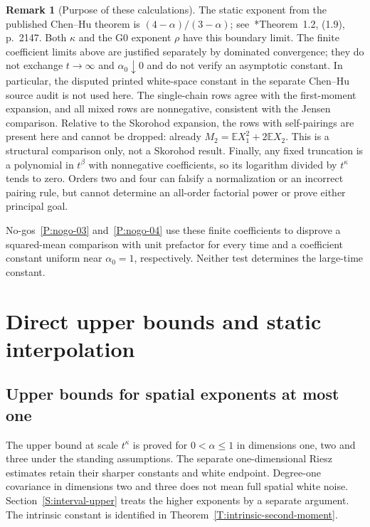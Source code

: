 \documentclass[12pt,oneside,openany]{book}
\numberwithin{equation}{section}
\theoremstyle{nogostyle}
\theoremstyle{definition}
\newtheorem{remark}[theorem]{Remark}
\newcommand{\E}{\mathbb{E}}
\begin{document}
\begin{remark}[Purpose of these calculations]\label{R:G1-scope}
  The static exponent from the published Chen--Hu theorem is
  $(4-\alpha)/(3-\alpha)$; see~\cite{chen.hu:25:hyperbolic}*{Theorem~1.2, (1.9),
  p.~2147}. Both $\kappa$ and the G0 exponent $\rho$ have this boundary limit.
  The finite coefficient limits above are justified separately by dominated
  convergence; they do not exchange $t \to \infty$ and $\alpha_0\downarrow0$ and
  do not verify an asymptotic constant. In particular, the disputed printed
  white-space constant in the separate Chen--Hu source audit is not used here.
  The single-chain rows agree with the first-moment expansion, and all mixed
  rows are nonnegative, consistent with the Jensen comparison. Relative to the
  Skorohod expansion, the rows with self-pairings are present here and cannot be
  dropped: already $M_2 = \E X_1^2+2\E X_2$. This is a structural comparison
  only, not a Skorohod result. Finally, any fixed truncation is a polynomial in
  $t^\beta$ with nonnegative coefficients, so its logarithm divided by
  $t^\kappa$ tends to zero. Orders two and four can falsify a normalization or
  an incorrect pairing rule, but cannot determine an all-order factorial power
  or prove either principal goal.
\end{remark}

No-gos~\ref{P:nogo-03} and~\ref{P:nogo-04} use these finite coefficients
to disprove a squared-mean comparison with unit prefactor for every time
and a coefficient constant uniform near $\alpha_0=1$, respectively.
Neither test determines the large-time constant.



\chapter{Direct upper bounds and static interpolation}\label{S:appendix-direct}



\section{Upper bounds for spatial exponents at most one}\label{S:d1-upper}

The upper bound at scale $t^\kappa$ is proved for $0 < \alpha \le 1$ in
dimensions one, two and three under the standing assumptions. The separate
one-dimensional Riesz estimates retain their sharper constants and white
endpoint. Degree-one covariance in dimensions two and three does not mean full
spatial white noise. Section~\ref{S:interval-upper} treats the higher exponents
by a separate argument. The intrinsic constant is identified  in
Theorem~\ref{T:intrinsic-second-moment}.
\end{document}
